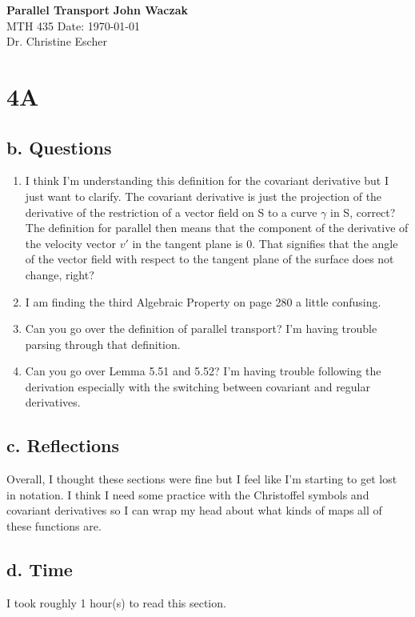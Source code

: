 \documentclass[a4paper, 11pt]{article}
\begin{document}
\noindent
\large\textbf{Parallel Transport} \hfill \textbf{John Waczak} \\
\normalsize MTH 435 \hfill  Date: \today \\
Dr. Christine Escher \\

\section*{4A}
\subsection*{b. Questions}
	\begin{enumerate}
		\item I think I'm understanding this definition for the covariant derivative but I just want to clarify. The covariant derivative is just the projection of the derivative of the restriction of a vector field on S to a curve $\gamma$ in S, correct? The definition for parallel then means that the component of the derivative of the velocity vector $v'$ in the tangent plane is 0. That signifies that the angle of the vector field with respect to the tangent plane of the surface does not change, right? 
		\item I am finding the third Algebraic Property on page 280 a little confusing. 
		\item Can you go over the definition of parallel transport? I'm having trouble parsing through that definition. 
		\item Can you go over Lemma 5.51 and 5.52? I'm having trouble following the derivation especially with the switching between covariant and regular derivatives. 
	\end{enumerate}
\subsection*{c. Reflections}
		Overall, I thought these sections were fine but I feel like I'm starting to get lost in notation. I think I need some practice with the Christoffel symbols and covariant derivatives so I can wrap my head about what kinds of maps all of these functions are. 
\subsection*{d. Time}
I took roughly 1 hour(s) to read this section. 
\end{document}
